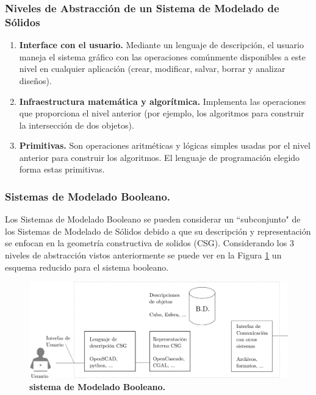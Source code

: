 \subsubsection{Niveles de Abstracción de un Sistema de Modelado de Sólidos}

\begin{enumerate}
\item \textbf{Interface con el usuario.} Mediante un lenguaje de descripción, el usuario maneja el sistema gráfico con las operaciones comúnmente disponibles a este nivel en cualquier aplicación (crear, modificar, salvar, borrar y analizar diseños).
\item \textbf{Infraestructura matemática y algorítmica.} Implementa las operaciones que proporciona el nivel anterior (por ejemplo, los algoritmos para construir la intersección de dos objetos).
\item \textbf{Primitivas.} Son operaciones aritméticas y lógicas simples usadas por el nivel anterior para construir los algoritmos. El lenguaje de programación elegido forma estas primitivas.
\end{enumerate}

\subsubsection{ Sistemas de Modelado Booleano. }

Los Sistemas de Modelado Booleano se pueden considerar un ``subconjunto" de los Sistemas de Modelado de Sólidos debido a que su descripción y representación se enfocan en la geometría constructiva de solidos (CSG). Considerando los 3 niveles de abstracción vistos anteriormente se puede ver en la Figura \ref{fig:sistemabool} un esquema reducido para el sistema booleano.

\begin{figure}[h]
\includegraphics[width=16cm]{Img/GEO/geo-sistema1.jpg}
\centering
\caption{\textbf{\footnotesize{sistema de Modelado Booleano. }}}
\label{fig:sistemabool}
\end{figure}


